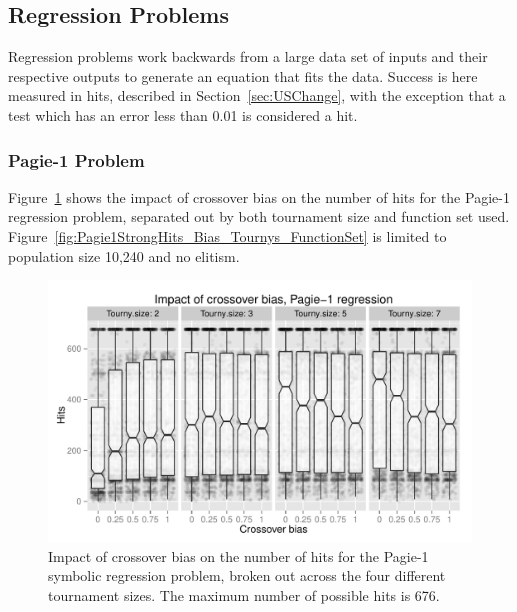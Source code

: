 \documentclass{sig-alternate}
\begin{document}
%
%
%
%


\subsection{Regression Problems}

Regression problems work backwards from a large data set of inputs and their respective outputs to generate an equation
that fits the data. Success is here measured in hits, described in Section~\ref{sec:USChange}, with the exception that a test which has an error less than 0.01 is considered a hit. 

\subsubsection{Pagie-1 Problem}

Figure~\ref{fig:Pagie1Hits_Bias_Tournys_FunctionSet} shows the impact of crossover bias on the number of hits for the
Pagie-1 regression problem, separated out by both tournament size and function set used. 
Figure~\ref{fig:Pagie1StrongHits_Bias_Tournys_FunctionSet} is limited  to population size 10,240
and no elitism.

\begin{figure}[tb]
\centering
\includegraphics[width=0.45 \textwidth]{Plots/Pagie_1_Hits_vs_Bias_Tournys.pdf}
\caption{Impact of crossover bias on the number of hits for the Pagie-1 symbolic regression problem, 
	broken out across the four different tournament sizes. The maximum number of possible hits is 676.}
\label{fig:Pagie1Hits_Bias_Tournys_FunctionSet}
\end{figure}
\end{document}

